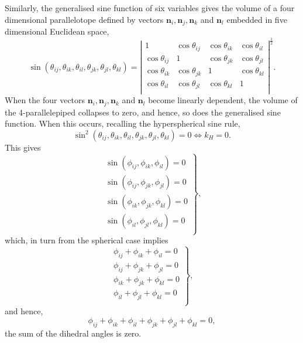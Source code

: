 \documentclass[fleqn,11pt,twoside]{article}
\theoremstyle{definition}
\begin{document}
Similarly, the generalised sine function of six variables gives the volume of a four dimensional parallelotope defined by vectors $\mathbf{n}_i,\mathbf{n}_j,\mathbf{n}_k$ and $\mathbf{n}_l$ embedded in five dimensional Euclidean space,
\begin{equation}
\sin(\theta_{ij},\theta_{ik},\theta_{il},\theta_{jk},\theta_{jl},\theta_{kl})=\left|\begin{array}{cccc}
1&
\cos\theta_{ij}&
\cos\theta_{ik}&
\cos\theta_{il}\\
\cos\theta_{ij}&
1&
\cos\theta_{jk}&
\cos\theta_{jl}\\
\cos\theta_{ik}&
\cos\theta_{jk}&
1&
\cos\theta_{kl}\\
\cos\theta_{il}&
\cos\theta_{jl}&
\cos\theta_{kl}&
1\\
\end{array}\right|^\frac{1}{2}.
\end{equation}
When the four vectors $\mathbf{n}_i,\mathbf{n}_j,\mathbf{n}_k$ and $\mathbf{n}_l$ become linearly dependent, the volume of the 4-parallelepiped collapses to zero, and hence, so does the generalised sine function. When this occurs, recalling the hyperspherical sine rule,
\begin{equation}
\sin^2(\theta_{ij},\theta_{ik},\theta_{il},\theta_{jk},\theta_{jl},\theta_{kl})=0\iff k_H=0.
\end{equation}
This gives
\begin{equation}\left.
\begin{array}{c}
\sin(\phi_{ij},\phi_{ik},\phi_{il})=0\\
\sin(\phi_{ij},\phi_{jk},\phi_{jl})=0\\
\sin(\phi_{ik},\phi_{jk},\phi_{kl})=0\\
\sin(\phi_{il},\phi_{jl},\phi_{kl})=0\\
\end{array}
\right\},
\end{equation}
which, in turn from the spherical case implies
\begin{equation}\left.
\begin{array}{c}
\phi_{ij}+\phi_{ik}+\phi_{il}=0\\
\phi_{ij}+\phi_{jk}+\phi_{jl}=0\\
\phi_{ik}+\phi_{jk}+\phi_{kl}=0\\
\phi_{il}+\phi_{jl}+\phi_{kl}=0\\
\end{array}
\right\},
\end{equation}
and hence,
\begin{equation}
\phi_{ij}+\phi_{ik}+\phi_{il}+\phi_{jk}+\phi_{jl}+\phi_{kl}=0,
\end{equation}
the sum of the dihedral angles is zero.
\end{document}
